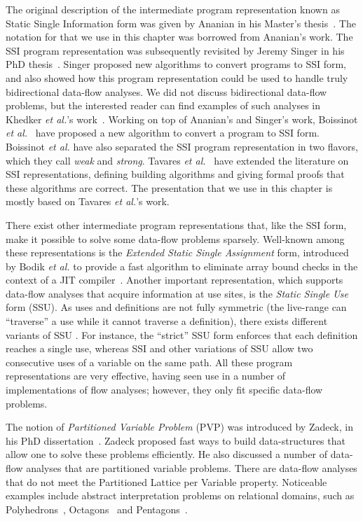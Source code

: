 {The original description of the intermediate program representation known as Static Single Information form was given by Ananian in his Master's thesis~\cite{Ananian99}.
The notation for \sigmafuns that we use in this chapter was borrowed from Ananian's work.
The SSI program representation was subsequently revisited by Jeremy Singer in his PhD thesis~\cite{Singer06}.
Singer proposed new algorithms to convert programs to SSI form, and also showed how this program representation could be used to handle truly bidirectional data-flow analyses.
We did not discuss bidirectional data-flow problems, but the interested reader can find examples of such analyses in Khedker {\em et al.}'s work~\cite{Khedker99}.
Working on top of Ananian's and Singer's work, Boissinot {\em et al.}~\cite{BoissinotBDR12} have proposed a new algorithm to convert a program to SSI form.
Boissinot {\em et al.} have also separated the SSI program representation in two flavors, which they call {\em weak} and {\em strong}.
Tavares {\em et al.}~\cite{Tavares11b} have extended the literature on SSI representations, defining building algorithms and giving formal proofs that these algorithms are correct.
The presentation that we use in this chapter is mostly based on Tavares {\em et
al.}'s work.

There exist other intermediate program representations that, like the SSI form, make it possible to solve some data-flow problems sparsely.
Well-known among these representations is the {\em Extended Static Single Assignment} form, introduced by Bodik {\em et al.} to provide a fast algorithm to eliminate array bound checks in the context of a JIT compiler~\cite{Bodik00}.
Another important representation, which supports data-flow analyses that acquire information at use sites, is the \emph{Static Single Use} form (SSU).
As uses and definitions are not fully symmetric (the live-range can ``traverse'' a use while it cannot traverse a definition), there exists different variants of SSU \cite{Plevyak96,George03-IXP,Lo98_registerPromotion}.
For instance, the ``strict'' SSU form enforces that each definition reaches a
single use, whereas SSI and other variations of SSU allow two consecutive uses
of a variable on the same path.
All these program representations are very effective, having seen use in a number of implementations of flow analyses; however, they only fit specific data-flow problems.

The notion of {\em Partitioned Variable Problem} (PVP) was introduced by Zadeck, in his PhD dissertation~\cite{Zadeck84}.
Zadeck proposed fast ways to build data-structures that allow one to solve these problems efficiently.
He also discussed a number of data-flow analyses that are partitioned variable problems.
There are data-flow analyses that do not meet the Partitioned Lattice per Variable property.
Noticeable examples include abstract interpretation problems on relational domains, such as Polyhedrons~\cite{Cousot78}, Octagons~\cite{Mine06} and Pentagons~\cite{Logozzo08}.

}
